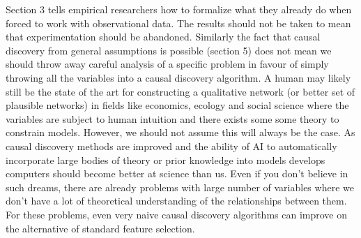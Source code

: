 \documentclass[11pt,a4paper]{article}
\begin{document}
Section 3 tells empirical researchers how to formalize what they already do when forced to work with observational data. The results should not be taken to mean that experimentation should be abandoned. Similarly the fact that causal discovery from general assumptions is possible (section 5) does not mean we should throw away careful analysis of a specific problem in favour of simply throwing all the variables into a causal discovery algorithm. A human may likely still be the state of the art for constructing a qualitative network (or better set of plausible networks) in fields like economics, ecology and social science where the variables are subject to human intuition and there exists some some theory to constrain models. However, we should not assume this will always be the case. As causal discovery methods are improved and the ability of AI to automatically incorporate large bodies of theory or prior knowledge into models develops computers should become better at science than us. Even if you don't believe in such dreams, there are already problems with large number of variables where we don't have a lot of theoretical understanding of the relationships between them. For these problems, even very naive causal discovery algorithms can improve on the alternative of standard feature selection.

\end{document}
